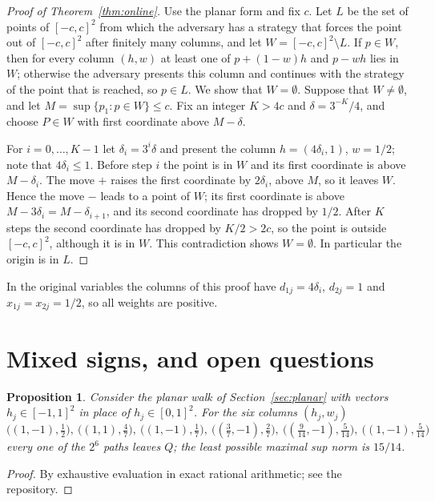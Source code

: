 \documentclass[11pt]{article}
\newtheorem{proposition}[theorem]{Proposition}
\theoremstyle{definition}
\begin{document}
\begin{proof}[Proof of Theorem~\ref{thm:online}]
Use the planar form and fix $c$.  Let $L$ be the set of points of
$[-c,c]^2$ from which the adversary has a strategy that forces the point
out of $[-c,c]^2$ after finitely many columns, and let
$W=[-c,c]^2\setminus L$.  If $p\in W$, then for every column $(h,w)$ at
least one of $p+(1-w)h$ and $p-wh$ lies in $W$; otherwise the adversary
presents this column and continues with the strategy of the point that
is reached, so $p\in L$.  We show that $W=\emptyset$.  Suppose that
$W\ne\emptyset$, and let
$M=\sup\{p_1:p\in W\}\le c$.  Fix an integer $K>4c$ and
$\delta=3^{-K}/4$, and choose $P\in W$ with first coordinate above
$M-\delta$.

For $i=0,\dots,K-1$ let $\delta_i=3^i\delta$ and present the column
$h=(4\delta_i,1)$, $w=1/2$; note that $4\delta_i\le1$.  Before step $i$ the point is in $W$ and its
first coordinate is above $M-\delta_i$.  The move $+$ raises the first
coordinate by $2\delta_i$, above $M$, so it leaves $W$.  Hence the move
$-$ leads to a point of $W$; its first coordinate is above
$M-3\delta_i=M-\delta_{i+1}$, and its second coordinate has dropped by
$1/2$.  After $K$ steps the second coordinate has dropped by $K/2>2c$, so
the point is outside $[-c,c]^2$, although it is in $W$.  This
contradiction shows $W=\emptyset$.  In particular the origin is in $L$.
\end{proof}

In the original variables the columns of this proof have
$d_{1j}=4\delta_i$, $d_{2j}=1$ and $x_{1j}=x_{2j}=1/2$, so all weights are
positive.

\section{Mixed signs, and open questions}\label{sec:open}

\begin{proposition}\label{prop:mixed}
Consider the planar walk of Section~\ref{sec:planar} with vectors
$h_j\in[-1,1]^2$ in place of $h_j\in[0,1]^2$.  For the six columns
$(h_j,w_j)$
\[
 \bigl((1,-1),\tfrac12\bigr),\
 \bigl((1,1),\tfrac47\bigr),\
 \bigl((1,-1),\tfrac17\bigr),\
 \bigl((\tfrac37,-1),\tfrac27\bigr),\
 \bigl((\tfrac9{14},-1),\tfrac5{14}\bigr),\
 \bigl((1,-1),\tfrac5{14}\bigr)
\]
every one of the $2^6$ paths leaves $Q$; the least possible maximal sup
norm is $15/14$.
\end{proposition}
\begin{proof}
By exhaustive evaluation in exact rational arithmetic; see the
repository.
\end{proof}
\end{document}
